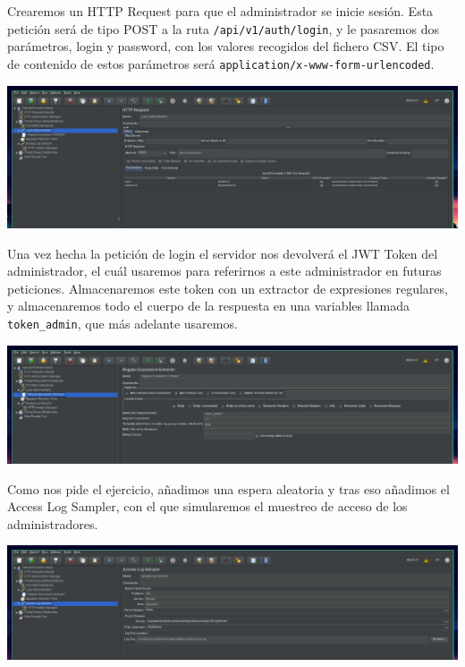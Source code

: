 \documentclass[12pt, spanish]{article}
\begin{document}
Crearemos un HTTP Request para que el administrador se inicie sesión. Esta petición será de tipo POST a la ruta \texttt{/api/v1/auth/login}, y le pasaremos dos parámetros, login y password, con los valores recogidos del fichero CSV. El tipo de contenido de estos parámetros será \texttt{application/x-www-form-urlencoded}.

\begin{center}
\includegraphics[scale=0.25]{jmeter-4.png}
\end{center}

Una vez hecha la petición de login el servidor nos devolverá el JWT Token del administrador, el cuál usaremos para referirnos a este administrador en futuras peticiones. Almacenaremos este token con un extractor de expresiones regulares, y almacenaremos todo el cuerpo de la respuesta en una variables llamada \texttt{token\_admin}, que más adelante usaremos.

\begin{center}
\includegraphics[scale=0.25]{jmeter-5.png}
\end{center}

Como nos pide  el ejercicio, añadimos una espera aleatoria y tras eso añadimos el Access Log Sampler, con el que simularemos el muestreo de acceso de los administradores.

\begin{center}
\includegraphics[scale=0.25]{jmeter-6.png}
\end{center}
\end{document}
